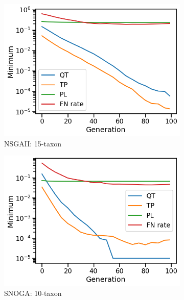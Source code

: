 \begin{figure}[!h]
\begin{subfigure}[b]{0.3\textwidth}
			\includegraphics[width=\textwidth]{Figure/15-taxon_NSGAII_minimum}
			\caption{NSGAII: 15-taxon}
		\end{subfigure}
		\begin{subfigure}[b]{0.3\textwidth}
			\includegraphics[width=\textwidth]{Figure/10-taxon_NOSSGA_minimum}
			\caption{SNOGA: 10-taxon}
		\end{subfigure}%
		\begin{subfigure}[b]{0.3\textwidth}

\end{subfigure}
\end{figure}
